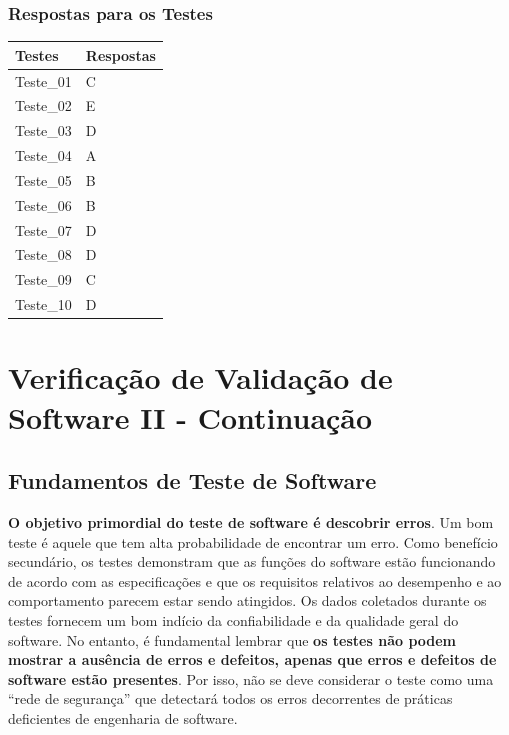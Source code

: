 \documentclass[
]{book}
\begin{document}
\subsection{Respostas para os Testes}\label{respostas-para-os-testes}

\begin{longtable}[]{@{}ll@{}}
\toprule\noalign{}
Testes & Respostas \\
\midrule\noalign{}
\endhead
\bottomrule\noalign{}
\endlastfoot
Teste\_01 & C \\
Teste\_02 & E \\
Teste\_03 & D \\
Teste\_04 & A \\
Teste\_05 & B \\
Teste\_06 & B \\
Teste\_07 & D \\
Teste\_08 & D \\
Teste\_09 & C \\
Teste\_10 & D \\
\end{longtable}

\chapter{Verificação de Validação de Software II - Continuação}\label{verificauxe7uxe3o-de-validauxe7uxe3o-de-software-ii---continuauxe7uxe3o}

\section{Fundamentos de Teste de Software}\label{fundamentos-de-teste-de-software}

\textbf{O objetivo primordial do teste de software é descobrir erros}. Um bom teste é aquele que tem alta probabilidade de encontrar um erro. Como benefício secundário, os testes demonstram que as funções do software estão funcionando de acordo com as especificações e que os requisitos relativos ao desempenho e ao comportamento parecem estar sendo atingidos. Os dados coletados durante os testes fornecem um bom indício da confiabilidade e da qualidade geral do software. No entanto, é fundamental lembrar que \textbf{os testes não podem mostrar a ausência de erros e defeitos, apenas que erros e defeitos de software estão presentes}. Por isso, não se deve considerar o teste como uma ``rede de segurança'' que detectará todos os erros decorrentes de práticas deficientes de engenharia de software.
\end{document}
